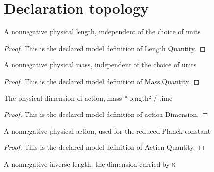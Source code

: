 \section{Declaration topology}
\begin{definition}
  \label{def:physics:phyx-mini-0617:phyxminiproblems-problemphyxmini0617-lengthquantity}
  A nonnegative physical length, independent of the choice of units
\end{definition}
\begin{proof}
  This is the declared model definition of Length Quantity.
\end{proof}
\begin{definition}
  \label{def:physics:phyx-mini-0617:phyxminiproblems-problemphyxmini0617-massquantity}
  A nonnegative physical mass, independent of the choice of units
\end{definition}
\begin{proof}
  This is the declared model definition of Mass Quantity.
\end{proof}
\begin{definition}
  \label{def:physics:phyx-mini-0617:phyxminiproblems-problemphyxmini0617-actiondimension}
  The physical dimension of action, mass * length² / time
\end{definition}
\begin{proof}
  This is the declared model definition of action Dimension.
\end{proof}
\begin{definition}
  \label{def:physics:phyx-mini-0617:phyxminiproblems-problemphyxmini0617-actionquantity}
  A nonnegative physical action, used for the reduced Planck constant
\end{definition}
\begin{proof}
  This is the declared model definition of Action Quantity.
\end{proof}
\begin{definition}
  \label{def:physics:phyx-mini-0617:phyxminiproblems-problemphyxmini0617-wavenumberquantity}
  A nonnegative inverse length, the dimension carried by κ
\end{definition}
